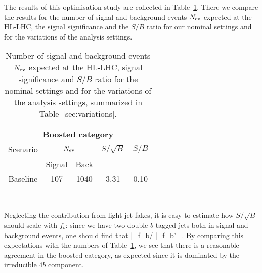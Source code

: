 The results of this optimisation study are collected in
Table~\ref{table:cutflowMVAoptimisation}.
%
There we compare the results for the number of signal
and background events $N_{\rm ev}$ expected at the
HL-LHC, the signal significance and the $S/B$ ratio
for our nominal settings and for the variations
of the analysis settings.

\begin{table}[t]
  \centering
  \begin{tabular}{c||c|c|c|c}
    \hline
    \multicolumn{5}{c}{Boosted category}\\
    \hline
    \hline
 Scenario &    \multicolumn{2}{c|}{$N_{\rm ev}$} &  $S/\sqrt{B}$  & $S/B$ \\
       &   Signal & Back   &     &    \\
 \hline
 \hline
   Baseline   & 107 & 1040 & 3.31  & 0.10\\
   \hline
   &  &   &   &   \\
   &  &   &   &   \\
   &  &   &   &   \\
   &  &   &   &   \\
         &  &   &   &   \\
   \hline
  \end{tabular}
  \caption{\small
Number of signal
and background events $N_{\rm ev}$ expected at the
HL-LHC, signal significance and $S/B$ ratio
for the nominal settings and for the variations
of the analysis settings, summarized
in  Table~\ref{sec:variations}.
 \label{table:cutflowMVAoptimisation}
  }
\end{table}

Neglecting the
contribution from light jet fakes,
it is easy to estimate how $S/\sqrt{B}$ should
scale with $f_b$: since we have two double-$b$-tagged jets
both in signal and background events, one should find that
\be
{}\Bigg|_{f_b}\Bigg/
\Bigg|_{f_b'}
\simeq {} \, .
\ee
By comparing this expectations with the numbers of
Table~\ref{table:cutflowMVAoptimisation}, we see that there
is a reasonable agreement in the boosted category,
as expected since it is dominated by the irreducible
$4b$ component.
